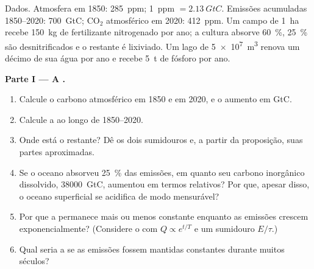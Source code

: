 \begin{problem}
\label{pb:b2:biogeochemical-cycles:1}
Dados. Atmosfera em 1850: \qty{285}{ppm}; \qty{1}{ppm} $=
\qty{2.13}{GtC}$. Emissões acumuladas 1850--2020: \qty{700}{GtC};
$\mathrm{CO_2}$ atmosférico em 2020: \qty{412}{ppm}. Um campo de
\qty{1}{ha} recebe \qty{150}{kg} de fertilizante nitrogenado por ano;
a cultura absorve \qty{60}{\%}, \qty{25}{\%} são desnitrificados e o
restante é lixiviado. Um lago de \qty{5e7}{m^3} renova um décimo de sua
água por ano e recebe \qty{5}{t} de fósforo por ano.

\medskip
\noindent\textbf{Parte I --- A .}
\begin{enumerate}
  \item Calcule o carbono atmosférico em 1850 e em 2020, e o
        aumento em GtC.
  \item Calcule a  ao longo de 1850--2020.
  \item Onde está o restante? Dê os dois sumidouros e, a partir da
        proposição, suas partes aproximadas.
  \item Se o oceano absorveu \qty{25}{\%} das emissões, em quanto seu
        carbono inorgânico dissolvido, \qty{38000}{GtC}, aumentou em
        termos relativos? Por que, apesar disso, o oceano superficial se
        acidifica de modo mensurável?
  \item Por que a  permanece mais ou menos constante
        enquanto as emissões crescem exponencialmente? (Considere o  com $Q \propto e^{t/T}$ e um sumidouro $E/\tau$.)
  \item Qual seria a  se as emissões fossem
        mantidas constantes durante muitos séculos?
\end{enumerate}


\end{problem}
